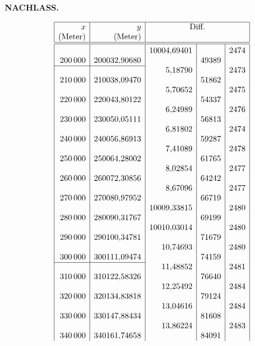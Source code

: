 \par\clearpage
{}\hfill{\small\textbf{NACHLASS.}}\hfill\null\par\medskip
{\footnotesize\renewcommand{\arraystretch}{.63}
\[\begin{array}{|r|r|r|r|r|}\hline
\rule{0pt}{2ex}x&y&\multicolumn{3}{c|}{\text{Diff.}}\\
\rule[-3.6pt]{0pt}{3.6pt}\text{(Meter)}&\text{(Meter)}&\multicolumn{3}{c|}{}\\\hline\hline
\rule{0pt}{2.5ex}&&10004{,}69401&&2474\\
200\,000&200032{,}90680&&49389&\\
\cline{1-2}
&&5{,}18790&&2473\\
210\,000&210038{,}09470&&51862&\\
&&5{,}70652&&2475\\
220\,000&220043{,}80122&&54337&\\
&&6{,}24989&&2476\\
230\,000&230050{,}05111&&56813&\\
&&6{,}81802&&2474\\
240\,000&240056{,}86913&&59287&\\
&&7{,}41089&&2478\\
250\,000&250064{,}28002&&61765&\\
&&8{,}02854&&2477\\
260\,000&260072{,}30856&&64242&\\
&&8{,}67096&&2477\\
270\,000&270080{,}97952&&66719&\\
&&10009{,}33815&&2480\\
280\,000&280090{,}31767&&69199&\\
&&10010{,}03014&&2480\\
290\,000&290100{,}34781&&71679&\\
&&10{,}74693&&2480\\
300\,000&300111{,}09474&&74159&\\
\cline{1-2}
&&11{,}48852&&2481\\
310\,000&310122{,}58326&&76640&\\
&&12{,}25492&&2484\\
320\,000&320134{,}83818&&79124&\\
&&13{,}04616&&2484\\
330\,000&330147{,}88434&&81608&\\
&&13{,}86224&&2483\\
340\,000&340161{,}74658&&84091&\\

\end{array}\]}
